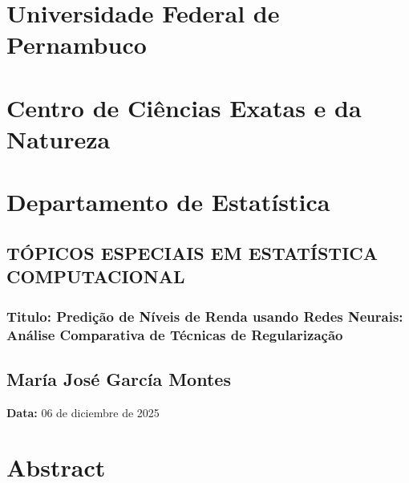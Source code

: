 \documentclass[
  oneclumn]{article}
\author{}
\date{}
\begin{document}
\section{Universidade Federal de
Pernambuco}\label{universidade-federal-de-pernambuco}

\vspace{-.4cm}

\section{Centro de Ciências Exatas e da
Natureza}\label{centro-de-ciuxeancias-exatas-e-da-natureza}

\vspace{-.4cm}

\section{Departamento de
Estatística}\label{departamento-de-estatuxedstica}

\vspace{.5cm}

\subsection{TÓPICOS ESPECIAIS EM ESTATÍSTICA
COMPUTACIONAL}\label{tuxf3picos-especiais-em-estatuxedstica-computacional}

\vspace{.5cm}

\subsubsection{Titulo: Predição de Níveis de Renda usando Redes Neurais:
Análise Comparativa de Técnicas de
Regularização}\label{titulo-prediuxe7uxe3o-de-nuxedveis-de-renda-usando-redes-neurais-anuxe1lise-comparativa-de-tuxe9cnicas-de-regularizauxe7uxe3o}

\vspace{.5cm}

\subsection{María José García
Montes}\label{maruxeda-josuxe9-garcuxeda-montes}

\textbf{Data:} 06 de diciembre de 2025

\vspace{.5cm}

\section{Abstract}\label{abstract}
\end{document}
